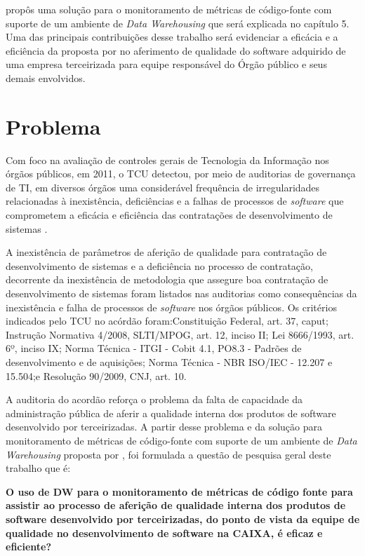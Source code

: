 \cite{rego_monitoramento_2014} propôs uma solução para o monitoramento de métricas de código-fonte com suporte de um ambiente de \textit{Data Warehousing} que será explicada no capítulo 5. Uma das principais contribuições desse trabalho será evidenciar a eficácia e a eficiência da proposta por  no aferimento de qualidade do software adquirido de uma empresa terceirizada para equipe responsável do Órgão público e seus demais envolvidos.

\section{Problema}

Com foco na avaliação de controles gerais de Tecnologia da Informação nos órgãos públicos, em 2011, o TCU detectou, por meio de auditorias de governança de TI, em diversos órgãos uma considerável frequência de irregularidades relacionadas à inexistência, deficiências e a falhas de processos de \textit{software} que comprometem a eficácia e eficiência das contratações de desenvolvimento de sistemas \cite{Acordao381_2011}. 

A inexistência de parâmetros de aferição de qualidade para contratação de desenvolvimento de sistemas e a deficiência no processo de contratação, decorrente da inexistência de metodologia que assegure boa contratação de desenvolvimento de sistemas foram listados nas auditorias como consequências da inexistência e falha de processos de \textit{software} nos órgãos públicos. Os critérios indicados pelo TCU no acórdão \cite{Acordao381_2011} foram:Constituição Federal, art. 37, caput; Instrução Normativa 4/2008, SLTI/MPOG, art. 12, inciso II; Lei 8666/1993, art. 6º, inciso IX; Norma Técnica - ITGI - Cobit 4.1, PO8.3 - Padrões de desenvolvimento e de aquisições; Norma Técnica - NBR ISO/IEC - 12.207 e 15.504;e Resolução 90/2009, CNJ, art. 10. 

A auditoria do acordão \cite{Acordao381_2011} reforça o problema da falta de capacidade da administração pública de aferir a qualidade interna dos produtos de software desenvolvido por terceirizadas. A partir desse problema e da solução para monitoramento de métricas de código-fonte com suporte de um ambiente de \textit{Data Warehousing} proposta por  , foi formulada a questão de pesquisa geral deste trabalho que é:

\textbf{O uso de DW para o monitoramento de métricas de código fonte para assistir ao processo de aferição de qualidade interna dos produtos de software desenvolvido por terceirizadas, do ponto de vista da equipe de qualidade no desenvolvimento de software na CAIXA, é eficaz e eficiente?}


